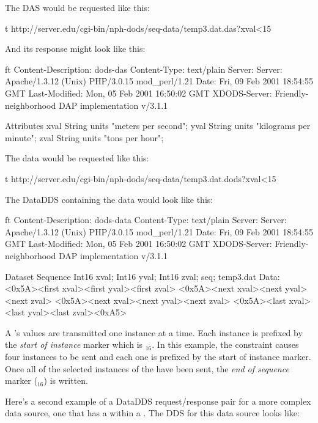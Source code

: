 \documentclass[justify]{nasa-ese}
\renewcommand{\new}[1]{\emph{#1}}
\begin{document}
The DAS would be requested like this:

\begin{vcode}{t}
http://server.edu/cgi-bin/nph-dods/seq-data/temp3.dat.das?xval<15
\end{vcode}

And its response might look like this:

\begin{vcode}{ft}
Content-Description: dods-das
Content-Type: text/plain
Server: Server: Apache/1.3.12 (Unix)  PHP/3.0.15 mod_perl/1.21
Date: Fri, 09 Feb 2001 18:54:55 GMT
Last-Modified: Mon, 05 Feb 2001 16:50:02 GMT
XDODS-Server: Friendly-neighborhood DAP implementation v/3.1.1

Attributes {
  xval {
    String units "meters per second";
  }
  yval {
    String units "kilograms per minute";
  }
  zval {
    String units "tons per hour";
  }
}
\end{vcode}

The data would be requested like this:

\begin{vcode}{t}
http://server.edu/cgi-bin/nph-dods/seq-data/temp3.dat.dods?xval<15
\end{vcode}

The DataDDS containing the data would look like this:

\begin{vcode}{ft}
Content-Description: dods-data
Content-Type: text/plain
Server: Server: Apache/1.3.12 (Unix)  PHP/3.0.15 mod_perl/1.21
Date: Fri, 09 Feb 2001 18:54:55 GMT
Last-Modified: Mon, 05 Feb 2001 16:50:02 GMT
XDODS-Server: Friendly-neighborhood DAP implementation v/3.1.1

Dataset {
  Sequence {
    Int16 xval;
    Int16 yval;
    Int16 zval;
  } seq;
} temp3.dat
Data:
<0x5A><first xval><first yval><first zval>
<0x5A><next xval><next yval><next zval>
<0x5A><next xval><next yval><next zval>
<0x5A><last xval><last yval><last zval><0xA5>
\end{vcode}

A \Sequence's values are transmitted one instance at a time. Each instance is
prefixed by the \new{start of instance} marker which is $_{16}$. In
this example, the constraint  causes four instances to be sent
and each one is prefixed by the start of instance marker. Once all of the
selected instances of the \Sequence have been sent, the \new{end of sequence}
marker ($_{16}$) is written. 

\label{seq:2-level}
Here's a second example of a DataDDS request/response pair for a more complex
data source, one that has a \Sequence within a \Sequence. The DDS for this
data source looks like:
\end{document}
